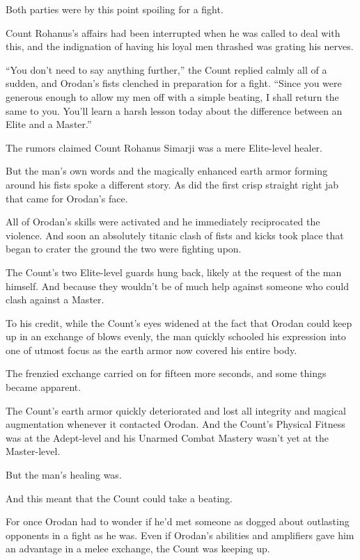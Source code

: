 \documentclass[a4paper,10pt]{book}
\begin{document}
Both parties were by this point spoiling for a fight.\par
Count Rohanus’s affairs had been interrupted when he was called to deal with this, and the indignation of having his loyal men thrashed was grating his nerves.\par
“You don’t need to say anything further,” the Count replied calmly all of a sudden, and Orodan’s fists clenched in preparation for a fight. “Since you were generous enough to allow my men off with a simple beating, I shall return the same to you. You’ll learn a harsh lesson today about the difference between an Elite and a Master.”\par
The rumors claimed Count Rohanus Simarji was a mere Elite-level healer.\par
But the man’s own words and the magically enhanced earth armor forming around his fists spoke a different story. As did the first crisp straight right jab that came for Orodan’s face.\par
All of Orodan’s skills were activated and he immediately reciprocated the violence. And soon an absolutely titanic clash of fists and kicks took place that began to crater the ground the two were fighting upon.\par
The Count’s two Elite-level guards hung back, likely at the request of the man himself. And because they wouldn’t be of much help against someone who could clash against a Master.\par
To his credit, while the Count’s eyes widened at the fact that Orodan could keep up in an exchange of blows evenly, the man quickly schooled his expression into one of utmost focus as the earth armor now covered his entire body.\par
The frenzied exchange carried on for fifteen more seconds, and some things became apparent.\par
The Count’s earth armor quickly deteriorated and lost all integrity and magical augmentation whenever it contacted Orodan. And the Count’s Physical Fitness was at the Adept-level and his Unarmed Combat Mastery wasn’t yet at the Master-level.\par
But the man’s healing was.\par
And this meant that the Count could take a beating.\par
For once Orodan had to wonder if he’d met someone as dogged about outlasting opponents in a fight as he was. Even if Orodan’s abilities and amplifiers gave him an advantage in a melee exchange, the Count was keeping up.\par
\end{document}
